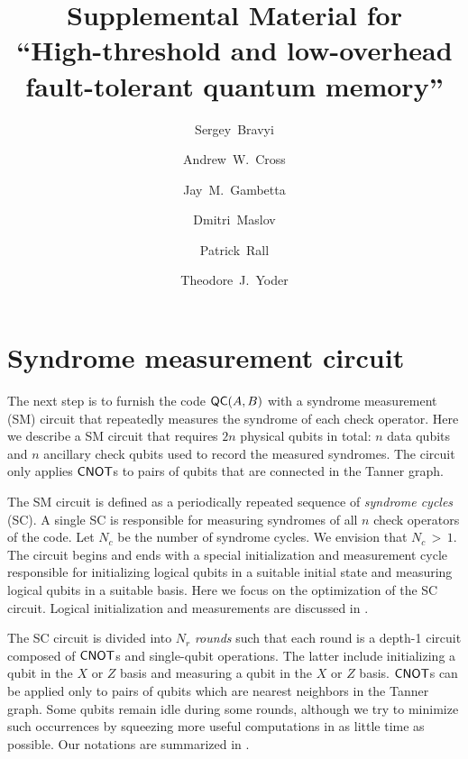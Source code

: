 \documentclass{article}
\title{Supplemental Material for\\ ``High-threshold and low-overhead fault-tolerant quantum memory''}
\author[1]{Sergey~Bravyi}
\author[1]{Andrew~W.~Cross}
\author[1]{Jay~M.~Gambetta}
\author[1]{Dmitri~Maslov}
\author[2]{Patrick~Rall}
\author[1]{Theodore~J.~Yoder}
\affil[1]{\large{IBM Quantum, IBM T.J. Watson Research Center, Yorktown Heights, NY 10598 (USA)}}
\affil[2]{IBM Quantum, MIT-IBM Watson AI Lab, Cambridge, MA 02142 (USA)}
\begin{document}
    \maketitle
    
    \tableofcontents
    
   \newcommand{\figlayout}{1 }
   \newcommand{\figwheelextraction}{4 }
   \newcommand{\eqnAB}{1}
   \newcommand{\lemkd}{1 }
   \newcommand{\figsyndromecircuit}{2 }
   \newcommand{\figsmallldpc}{3 A) }
   \newcommand{\figldpcvssurface}{3 B) }
   \newcommand{\tabcodesintro}{1 }
   \newcommand{\tabcodes}{2 }
   \newcommand{\fignavigation}{5 }
   \newcommand{\lemconnected}{3 }


\fi

\newcommand{\ifmain}[2]{\ifdefined\maindocument#1\else#2\fi}



\section{Syndrome measurement circuit}
\label{sec:syndrome_circuit}

The next step is to furnish the code $\mathsf{QC}(A,B)$ with a syndrome measurement (SM) circuit that repeatedly measures the syndrome of each check operator.  Here we describe a SM circuit that requires $2n$ physical qubits in total: $n$ data qubits and $n$ ancillary check qubits used to record the measured syndromes.  The circuit only applies $\mathsf{CNOT}$s to pairs of qubits that are connected in the Tanner graph. 

The SM circuit is defined as a periodically repeated sequence of {\em syndrome cycles} (SC).  A single SC is responsible for measuring syndromes of all $n$ check operators of the code.  Let $N_c$ be the number of syndrome cycles. We envision that $N_c\,{>}\,1$.  The circuit begins and ends with a special initialization and measurement cycle responsible for initializing logical qubits in a suitable initial state and measuring logical qubits in a suitable basis.  Here we focus on the optimization of the SC circuit.  Logical initialization and measurements are discussed in .


The SC circuit is divided into $N_r$ {\em rounds} such that each round is a depth-1 circuit composed of $\mathsf{CNOT}$s and single-qubit operations.  The latter include initializing a qubit in the $X$ or $Z$ basis and measuring a qubit in the $X$ or $Z$ basis.  $\mathsf{CNOT}$s can be applied only to pairs of qubits which are nearest neighbors in the Tanner graph.  Some qubits remain idle during some rounds, although we try to minimize such occurrences by squeezing more useful computations in as little time as possible.  Our notations are summarized in .
\end{document}
